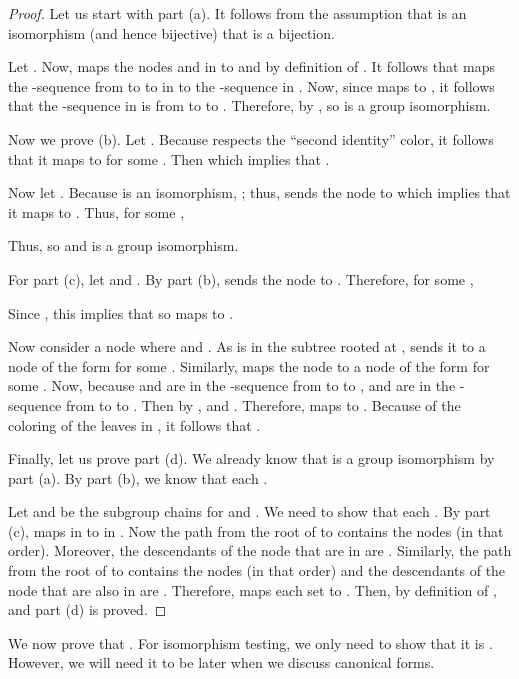 \begin{proof}
  Let us start with part (a).  It follows from the assumption that  is an isomorphism (and hence bijective) that  is a bijection.

  Let .  Now,  maps the nodes  and  in  to  and  by definition of .  It follows that  maps the -sequence  from  to  to  in  to the -sequence  in .  Now, since  maps  to , it follows that the -sequence  in  is from  to  to .  Therefore, by ,  so  is a group isomorphism.



  Now we prove (b).  Let .  Because  respects the ``second identity'' color, it follows that it maps  to  for some .  Then  which implies that .

  Now let .  Because  is an isomorphism, ; thus,  sends the node  to  which implies that it maps  to .  Thus, for some ,
  
  Thus,  so  and  is a group isomorphism.

  For part (c), let  and .  By part (b),  sends the node  to .  Therefore, for some ,
  
  Since , this implies that  so  maps  to .
  
  Now consider a node  where  and .  As  is in the subtree rooted at ,  sends it to a node of the form  for some .  Similarly,  maps the node  to a node of the form  for some .  Now, because  and  are in the -sequence from  to  to ,  and  are in the -sequence from  to  to .  Then by ,  and .  Therefore,  maps  to .  Because of the coloring of the leaves in , it follows that .

  Finally, let us prove part (d).  We already know that  is a group isomorphism by part (a).  By part (b), we know that each .

  Let  and  be the subgroup chains for  and .  We need to show that each .  By part (c),  maps  in  to  in .  Now the path from the root of  to  contains the nodes  (in that order).  Moreover, the descendants of the node  that are in  are .  Similarly, the path from the root of  to  contains the nodes  (in that order) and the descendants of the node  that are also in  are .  Therefore,  maps each set  to .  Then, by definition of ,  and part (d) is proved.
\end{proof}

We now prove that .  For isomorphism testing, we only need to show that it is .  However, we will need it to be  later when we discuss canonical forms.

